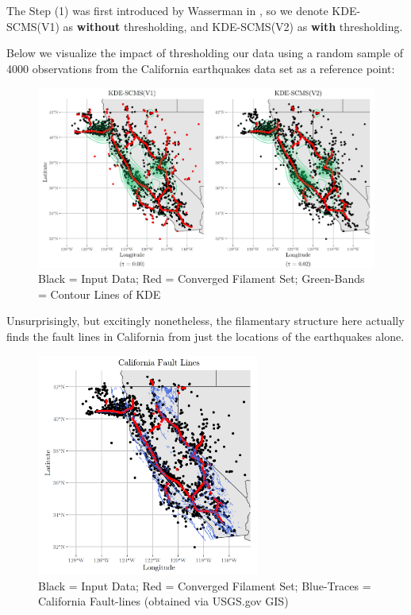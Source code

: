 \documentclass[letterpaper,fleqn]{article}
\theoremstyle{plain}
\theoremstyle{definition}
\newcommand{\1}{\mathds{1}}
\begin{document}
\mbox{}

The Step (1) was first introduced by Wasserman in \cite{SuRF}, so we denote KDE-SCMS(V1) as \textbf{without} thresholding, and KDE-SCMS(V2) as \textbf{with} thresholding. 

Below we visualize the impact of thresholding our data using a random sample of 4000 observations from the California earthquakes data set as a reference point:

\begin{figure}[!htb]
    \includegraphics[width=\textwidth]{combined.jpg}
    \caption{Black = Input Data; Red = Converged Filament Set; Green-Bands = Contour Lines of KDE}%
    \label{fig:thresholding}%
\end{figure}

\newpage

Unsurprisingly, but excitingly nonetheless, the filamentary structure here actually finds the fault lines in California from just the locations of the earthquakes alone.

\begin{figure}[!htb]
    \centering
    \includegraphics[width=0.65\textwidth]{faults_overlay.png}
    \caption{Black = Input Data; Red = Converged Filament Set; Blue-Traces = California Fault-lines (obtained via USGS.gov GIS)}%
    \label{fig:faultlines}%
\end{figure}
\end{document}
